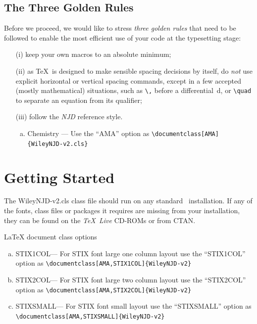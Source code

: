 \documentclass[AMA,STIX1COL]{WileyNJD-v2}
\begin{document}
\subsection{The Three Golden Rules} 

Before we proceed, we would like to
stress \emph{three golden rules} that need to be followed to
enable the most efficient use of your code at the typesetting
stage:
\begin{enumerate}
\item[(i)] keep your own macros to an absolute minimum;

\item[(ii)] as \TeX\ is designed to make sensible spacing
decisions by itself, do \emph{not} use explicit horizontal or
vertical spacing commands, except in a few accepted (mostly
mathematical) situations, such as \verb"\," before a
differential~d, or \verb"\quad" to separate an equation from its
qualifier;

\item[(iii)] follow the \emph{NJD} reference style.
\begin{enumerate}[a.]
\item Chemistry --- Use the ``AMA'' option as \verb"\documentclass[AMA]{WileyNJD-v2.cls}"

\end{enumerate}
\end{enumerate}


\section{Getting Started} The \textsf{WileyNJD-v2.cls} class file should run
on any standard \LaTeXe\ installation. If any of the fonts, class
files or packages it requires are missing from your installation,
they can be found on the \emph{\TeX\ Live} CD-ROMs or from CTAN.

LaTeX document class options

\begin{flushleft}
\begin{enumerate}[a.]
\item STIX1COL--- For STIX font large one column layout use the ``STIX1COL'' option as \verb"\documentclass[AMA,STIX1COL]{WileyNJD-v2}"
\item STIX2COL--- For STIX font large two column layout use the ``STIX2COL'' option as \verb"\documentclass[AMA,STIX2COL]{WileyNJD-v2}"
\item STIXSMALL--- For STIX font small layout use the ``STIXSMALL'' option as \verb"\documentclass[AMA,STIXSMALL]{WileyNJD-v2}"
\end{enumerate}
\end{flushleft}
\end{document}

